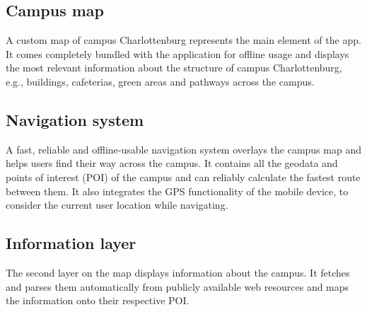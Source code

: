 \subsection{Campus map}
A custom map of campus Charlottenburg represents the main element of the app. It comes completely bundled with the application for offline usage and displays the most relevant information about the structure of campus Charlottenburg, e.g., buildings, cafeterias, green areas and pathways across the campus.

\subsection{Navigation system}
A fast, reliable and offline-usable navigation system overlays the campus map and helps users find their way across the campus. It contains all the geodata and points of interest (POI) of the campus and can reliably calculate the fastest route between them. It also integrates the GPS functionality of the mobile device, to consider the current user location while navigating.

\subsection{Information layer}
The second layer on the map displays information about the campus. It fetches and parses them automatically from publicly available web resources and maps the information onto their respective POI\@.